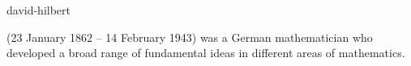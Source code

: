 \documentclass{stex}
\begin{document}
\begin{smodule}{david-hilbert}
\begin{sparagraph}[style=symdoc]
   (23 January 1862 – 14 February 1943) was a German mathematician who developed a broad range of fundamental ideas in different areas of mathematics.
\end{sparagraph}
\end{smodule}
\end{document}
